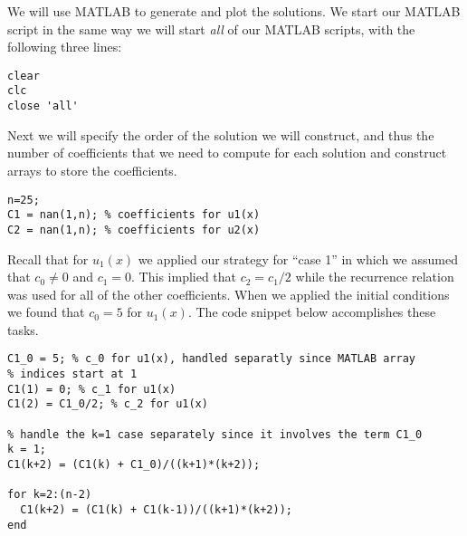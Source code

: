 We will use MATLAB to generate and plot the solutions.  We start our MATLAB script in the same way we will start \emph{all} of our MATLAB scripts, with the following three lines:
\begin{lstlisting}[name=lec9_ex1,style=myMatlab]
clear
clc
close 'all'
\end{lstlisting}
Next we will specify the order of the solution we will construct, and thus the number of coefficients that we need to compute for each solution and construct arrays to store the coefficients.
\begin{lstlisting}[name=lec9_ex1,style=myMatlab]
n=25;
C1 = nan(1,n); % coefficients for u1(x)
C2 = nan(1,n); % coefficients for u2(x)
\end{lstlisting}
Recall that for $u_1(x)$ we applied our strategy for ``case 1'' in which we assumed that $c_0 \ne 0$ and $c_1 = 0$.  This implied that $c_2 = c_1/2$ while the recurrence relation was used for all of the other coefficients.  When we applied the initial conditions we found that $c_0=5$ for $u_1(x)$.  The code snippet below accomplishes these tasks.
\begin{lstlisting}[name=lec9_ex1,style=myMatlab]
C1_0 = 5; % c_0 for u1(x), handled separatly since MATLAB array 
% indices start at 1
C1(1) = 0; % c_1 for u1(x)
C1(2) = C1_0/2; % c_2 for u1(x)

% handle the k=1 case separately since it involves the term C1_0
k = 1;
C1(k+2) = (C1(k) + C1_0)/((k+1)*(k+2));

for k=2:(n-2)
  C1(k+2) = (C1(k) + C1(k-1))/((k+1)*(k+2));
end
\end{lstlisting} 
